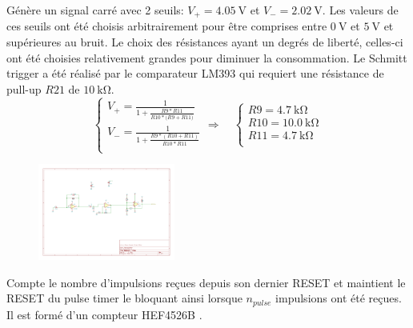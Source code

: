 \documentclass[french]{layout/Report}
\begin{document}
\begin{description}[leftmargin=!,labelwidth=3cm, labelindent=\parindent]
	\item[Schmitt trigger]
        Génère un signal carré avec 2 seuils: $V_+ = \SI{4.05}{\volt}$ et $V_- = \SI{2.02}{\volt}$.
        Les valeurs de ces seuils ont été choisis arbitrairement pour être comprises entre $\SI{0}{\volt}$ et $\SI{5}{\volt}$ et supérieures au bruit.
        Le choix des résistances ayant un degrés de liberté, celles-ci ont été choisies relativement grandes pour diminuer la consommation.
        Le Schmitt trigger a été réalisé par le comparateur LM393\cite{LM393} qui requiert une résistance de pull-up $\mathit{R21}$ de $\SI{10}{\kilo\ohm}$.
    	\begin{equation*}
    		\begin{cases}
    			V_+ = \frac{1}{1+\frac{\mathit{R9}*\mathit{R11}}{\mathit{R10}*(\mathit{R9+\mathit{R11})}}} \\
    			V_- = \frac{1}{1+\frac{\mathit{R9}*(\mathit{R10}+\mathit{R11})}{\mathit{R10}*\mathit{R11}}} \\
    		\end{cases}
    		\Rightarrow\quad
    		\begin{cases}
    			\mathit{R9}  = \SI{4.7}{\kilo\ohm} \\
    			\mathit{R10} = \SI{10.0}{\kilo\ohm} \\
    			\mathit{R11} = \SI{4.7}{\kilo\ohm} \\
    		\end{cases}
    		\end{equation*}

            \begin{figure}[H]
                \centering
                \includegraphics[width=0.4\textwidth]{fig/schmitt_trigger.pdf}
            \end{figure}

	\item[Down counter] Compte le nombre d'impulsions reçues depuis son dernier RESET et maintient le RESET du pulse timer le bloquant ainsi lorsque $n_{pulse}$ impulsions ont été reçues. Il est formé d'un compteur HEF4526B \cite{HEF4526B}.


\end{description}
\end{document}
